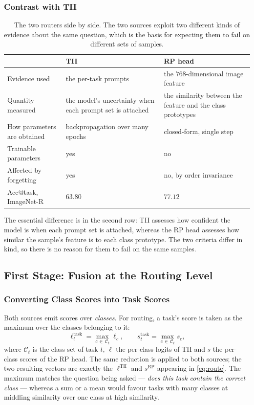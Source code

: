 \documentclass[11pt,a4paper]{article}
\begin{document}
\subsubsection{Contrast with TII}
\begin{table}[htbp]
\centering
\caption{The two routers side by side. The two sources exploit two different
kinds of evidence about the same question, which is the basis for expecting them
to fail on different sets of samples.}
\label{tab:tii-vs-rp}
\begin{tabular}{@{}p{3.3cm}p{4.9cm}p{5.2cm}@{}}
\toprule
 & TII & RP head \\
\midrule
Evidence used
  & the per-task prompts
  & the $768$-dimensional image feature \\
Quantity measured
  & the model's uncertainty when each prompt set is attached
  & the similarity between the feature and the class prototypes \\
How parameters are obtained
  & backpropagation over many epochs
  & closed-form, single step \\
Trainable parameters
  & yes
  & no \\
Affected by forgetting
  & yes
  & no, by order invariance \\
Acc@task, ImageNet-R
  & $63.80$
  & $77.12$ \\
\bottomrule
\end{tabular}
\end{table}

The essential difference is in the second row: TII assesses how confident the
model is when each prompt set is attached, whereas the RP head assesses how
similar the sample's feature is to each class prototype. The two criteria differ
in kind, so there is no reason for them to fail on the same samples.

\subsection{First Stage: Fusion at the Routing Level}
\label{sec:stage1}

\subsubsection{Converting Class Scores into Task Scores}

Both sources emit scores over \emph{classes}. For routing, a task's score is
taken as the maximum over the classes belonging to it:
\begin{equation}
\ell^{\mathrm{task}}_t = \max_{c \,\in\, \mathcal{C}_t} \ell_c ,
\qquad
s^{\mathrm{task}}_t = \max_{c \,\in\, \mathcal{C}_t} s_c ,
\label{eq:taskscore}
\end{equation}
where $\mathcal{C}_t$ is the class set of task $t$, $\ell$ the per-class logits
of TII and $s$ the per-class scores of the RP head. The same reduction is applied
to both sources; the two resulting vectors are exactly the
$\ell^{\mathrm{TII}}$ and $s^{\mathrm{RP}}$ appearing in \eqref{eq:route}. The
maximum matches the question being asked --- \emph{does this task contain the
correct class} --- whereas a sum or a mean would favour tasks with many classes
at middling similarity over one class at high similarity.
\end{document}
